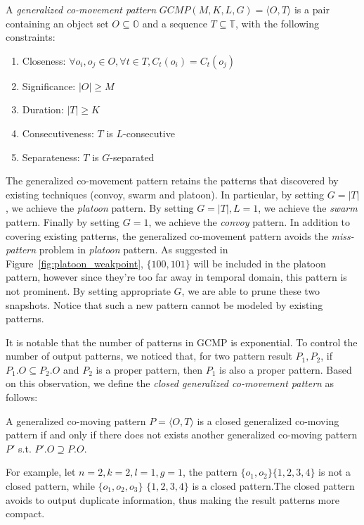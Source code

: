\begin{definition}
A \emph{generalized co-movement pattern} $GCMP(M,K,L,G)= \langle O,T \rangle$ is a pair containing an object set $O\subseteq \mathbb{O}$ and a sequence $T \subseteq \mathbb{T}$, with the following constraints:
\begin{enumerate}
\item{Closeness: $\forall o_i,o_j \in O, \forall t \in T, C_t(o_i) = C_t(o_j)$}
\item{Significance: $|O| \geq M$}
\item{Duration: $|T| \geq K$}
\item{Consecutiveness: $T$ is $L$-consecutive}
\item{Separateness: $T$ is $G$-separated}
\end{enumerate} 
\end{definition}

The generalized co-movement pattern retains the patterns that discovered by existing techniques (convoy, swarm and platoon). In particular, by setting $G=|T|$, we achieve the \emph{platoon} pattern. By setting $G=|T|,L=1$, we achieve the \emph{swarm} pattern. Finally by setting $G=1$, we achieve the \emph{convoy} pattern. In addition to covering existing patterns, the generalized co-movement pattern avoids the \emph{miss-pattern} problem in \emph{platoon} pattern. As suggested in Figure~\ref{fig:platoon_weakpoint}, $\{100,101\}$ will be included in the platoon pattern, however since they're too far away in temporal domain, this pattern is not prominent. By setting appropriate $G$, we are able to prune these two snapshots. Notice that such a new pattern cannot be modeled by existing patterns.
 
It is notable that the number of patterns in GCMP is exponential. To control the number of output patterns, we noticed that, for two pattern result $P_1,P_2$, if $P_1.O \subseteq P_2.O$ and $P_2$ is a proper pattern, then $P_1$ is also a proper pattern. Based on this observation, we define the \emph{closed generalized co-movement pattern} as follows:
\begin{definition}
A generalized co-moving pattern $P=\langle O, T \rangle$ is a closed generalized co-moving pattern if and only if there does not exists another generalized co-moving pattern $P'$ s.t. $P'.O \supseteq P.O$.
\end{definition}
For example, let $n=2,k=2,l=1,g=1$, the pattern $\{o_1,o_2\}\{1,2,3,4\}$ is not a closed pattern, while $\{o_1,o_2,o_3\}$ $\{1,2,3,4\}$ is a closed pattern.The closed pattern avoids to output duplicate information, thus making the result patterns more compact. 

